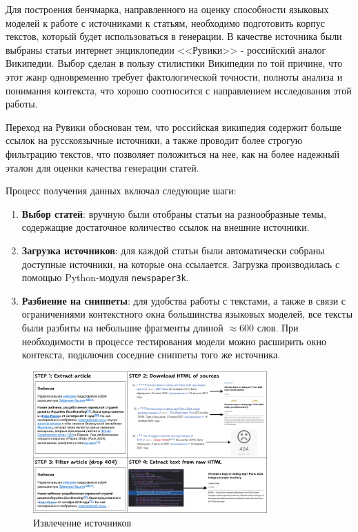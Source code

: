\documentclass{article}
\theoremstyle{definition}
\theoremstyle{plain}
\begin{document}
Для построения бенчмарка, направленного на оценку способности языковых моделей к работе с источниками к статьям, необходимо подготовить корпус текстов, который будет использоваться в генерации. 
В качестве источника были выбраны статьи интернет энциклопедии <<Рувики>> - российский аналог Википедии. Выбор сделан в пользу стилистики Википедии по той причине, что этот жанр
одновременно требует фактологической точности, полноты анализа и понимания контекста, что хорошо соотносится с направлением исследования этой работы.

Переход на Рувики обоснован тем, что российская википедия содержит больше ссылок на русскоязычные источники, а также проводит более строгую фильтрацию текстов, 
что позволяет положиться на нее, как на более надежный эталон для оценки качества генерации статей.

Процесс получения данных включал следующие шаги:

\begin{enumerate}

    \item \textbf{Выбор статей}: вручную были отобраны статьи на разнообразные темы, 
    содержащие достаточное количество ссылок на внешние источники.
    
    \item \textbf{Загрузка источников}: для каждой статьи были автоматически собраны доступные источники, на которые она ссылается. 
    Загрузка производилась с помощью Python-модуля \texttt{newspaper3k}.
    
    \item \textbf{Разбиение на сниппеты}: для удобства работы с текстами, а также в связи с ограничениями контекстного окна большинства языковых моделей, 
    все тексты были разбиты на небольшие фрагменты длиной $\approx 600$ слов. 
    При необходимости в процессе тестирования модели можно расширить окно контекста, подключив соседние сниппеты того же источника.

\end{enumerate}

\begin{figure}[ht!]
  \centering
  \includegraphics[width=0.8\textwidth]{figures/Source_extract.png}
  \caption{Извлечение источников}
  \label{fig:source}
\end{figure}
\end{document}
